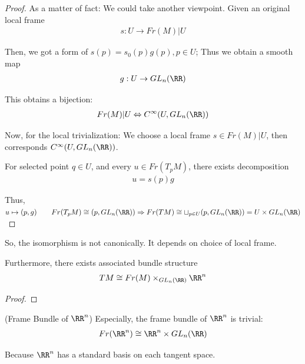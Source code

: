 \documentclass[Total.tex]{subfiles}
\begin{document}
			\begin{proof}
				As a matter of fact: We could take another viewpoint. Given an original local frame
				\begin{gather*}
					s:U\rightarrow Fr(M)|U
				\end{gather*}
				
				Then, we got a form of $s(p)=s_0(p)g(p),p\in U$; Thus we obtain a smooth map
				\begin{gather*}
					g:U\rightarrow GL_n(\RR)
				\end{gather*}
				
				This obtains a bijection:
				\begin{gather*}
					Fr(M)|U\Leftrightarrow C^\infty(U,GL_n(\RR))
				\end{gather*}
				
				Now, for the local trivialization: We choose a local frame $s\in Fr(M)|U$, then corresponds $C^\infty(U,GL_n(\RR))$.
				
				For selected point $q\in U$, and every $u\in Fr(T_p M)$, there exists decomposition
				\begin{gather*}
					u=s(p)g
				\end{gather*}
				
				Thus, $u\mapsto (p,g)\qquad Fr(T_p M)\cong (p,GL_n(\RR))\Rightarrow Fr(TM)\cong \sqcup_{p\in U} (p,GL_n(\RR))=U\times GL_n(\RR)$
			\end{proof}
			
			So, the isomorphism is not canonically. It depends on choice of local frame. 
			
			\begin{proposition}
				Furthermore, there exists associated bundle structure
				\begin{gather*} 
					TM\cong Fr(M)\times_{GL_n(\RR)} \RR^n
				\end{gather*}
			\end{proposition}
			\begin{proof}
				
			\end{proof}
			
			\begin{example}
				(Frame Bundle of $\RR^n$) Especially, the frame bundle of $\RR^n$ is trivial:
				\begin{gather*}
					Fr(\RR^n)\cong \RR^n\times GL_n(\RR)
				\end{gather*}
				
				Because $\RR^n$ has a standard basis on each tangent space. 
			\end{example}
			
\end{document}
